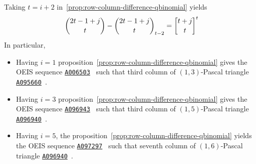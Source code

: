 Taking $t=i+2$ in~\eqref{prop:row-column-difference-qbinomial} yields
\begin{align*}
    \binom{2t-1+j}{t} - \rascalNumber{2t-1+j}{t}{t-2} = \oneQBinomial{t+j}{t}{t}
\end{align*}
In particular,
\begin{itemize}
    \item Having $i=1$ proposition~\eqref{prop:row-column-difference-qbinomial}
    gives the OEIS sequence \href{https://oeis.org/A006503}{\texttt{A006503}}~\cite{sloane1995n}
    such that third column of $(1,3)$-Pascal triangle
    \href{https://oeis.org/A095660}{\texttt{A095660}}~\cite{sloane2004pascal13}.
    \item Having $i=3$ proposition~\eqref{prop:row-column-difference-qbinomial}
    gives the OEIS sequence \href{https://oeis.org/A096943}{\texttt{A096943}}~\cite{sloane2004sixth}
    such that third column of $(1,5)$-Pascal triangle
    \href{https://oeis.org/A096940}{\texttt{A096940}}~\cite{sloane2004pascal}.
    \item Having $i=5$, the proposition~\eqref{prop:row-column-difference-qbinomial} yields
    the OEIS sequence \href{https://oeis.org/A097297}{\texttt{A097297}}~\cite{sloane2004seventh}
    such that seventh column of $(1,6)$-Pascal triangle
    \href{https://oeis.org/A096940}{\texttt{A096940}}~\cite{sloane2004pascal16}.
\end{itemize}
